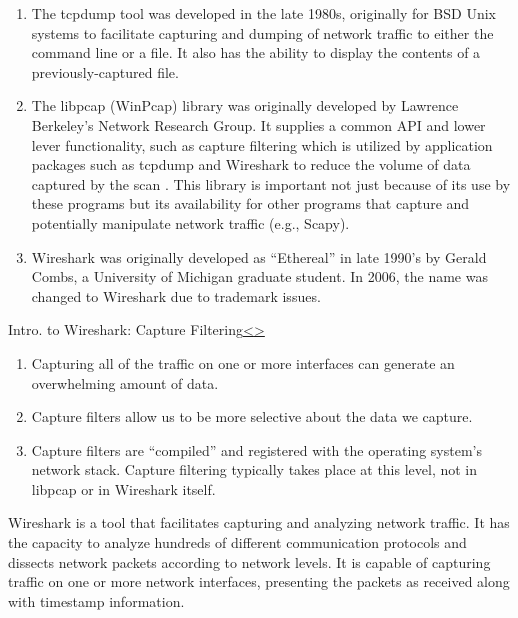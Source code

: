 \documentclass[12pt]{extarticle}
\newenvironment{instructionblock}{\Large\bgroup}{\egroup}
\newcommand{\ben}{\begin{enumerate}}
\newcommand{\een}{\end{enumerate}}
\begin{document}
\ben

\item The tcpdump tool was developed in the late 1980s, originally for BSD Unix systems to facilitate capturing and dumping of network traffic to either the command line or a file.  It also has the ability to display the contents of a previously-captured file. \cite{tcpdumpwiki} 

\item The libpcap (WinPcap) library was originally developed by Lawrence Berkeley’s Network Research Group. It supplies a common API and lower lever functionality, such as capture filtering which is utilized by application packages such as tcpdump and Wireshark to reduce the volume of data captured by the scan \cite{pcapwiki}. This library is important not just because of its use by these programs but its availability for other programs that capture and potentially manipulate network traffic (e.g., Scapy). 

\item Wireshark was originally developed as ``Ethereal'' in late 1990’s by Gerald Combs, a University of Michigan graduate student. In 2006, the name was changed to Wireshark due to trademark issues. 

\een



\pagebreak
\begin{slide}{Intro. to Wireshark: Capture Filtering}{\hyperref[slide 9]{\textless}\hyperref[slide 11]{\textgreater}}
\begin{instructionblock}
\begin{enumerate}
\item Capturing all of the traffic on one or more interfaces can generate an overwhelming amount of data.
\item Capture filters allow us to be more selective about the data we capture.
\item Capture filters are ``compiled'' and registered with the operating system's network stack. Capture filtering typically takes place at this level, not in libpcap or in Wireshark itself.
\end{enumerate}
\end{instructionblock}
\end{slide}
\vfill

\noindent
Wireshark is a tool that facilitates capturing and analyzing network traffic. It has the capacity to analyze hundreds of different communication protocols and dissects network packets according to network levels.  It is capable of capturing traffic on one or more network interfaces, presenting the packets as received along with timestamp information. 
\end{document}
